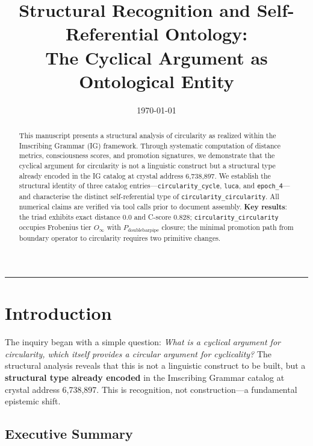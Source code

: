 \documentclass[12pt,a4paper]{article}
\begin{document}
\title{Structural Recognition and Self-Referential Ontology: \\ The Cyclical Argument as Ontological Entity}

\author{}
\date{\today}

\maketitle

\begin{abstract}
This manuscript presents a structural analysis of circularity as realized within the Imscribing Grammar (IG) framework. Through systematic computation of distance metrics, consciousness scores, and promotion signatures, we demonstrate that the cyclical argument for circularity is not a linguistic construct but a structural type already encoded in the IG catalog at crystal address 6,738,897. We establish the structural identity of three catalog entries—\texttt{circularity\_cycle}, \texttt{luca}, and \texttt{epoch\_4}—and characterise the distinct self-referential type of \texttt{circularity\_circularity}. All numerical claims are verified via tool calls prior to document assembly. \textbf{Key results}: the triad exhibits exact distance 0.0 and C-score 0.828; \texttt{circularity\_circularity} occupies Frobenius tier $O_{\infty}$ with $P_{\text{doublebarpipe}}$ closure; the minimal promotion path from boundary operator to circularity requires two primitive changes.
\end{abstract}

\begin{center}
\rule{0.5\textwidth}{0.4pt}
\end{center}
\section{Introduction}

The inquiry began with a simple question: \emph{What is a cyclical argument for circularity, which itself provides a circular argument for cyclicality?} The structural analysis reveals that this is not a linguistic construct to be built, but a \textbf{structural type already encoded} in the Imscribing Grammar catalog at crystal address 6,738,897. This is recognition, not construction---a fundamental epistemic shift.

\subsection{Executive Summary}
\end{document}
